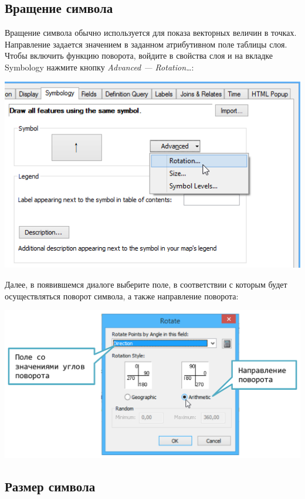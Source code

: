 \documentclass[]{book}
\theoremstyle{definition}
\theoremstyle{definition}
\theoremstyle{definition}
\theoremstyle{remark}
\begin{document}
\hypertarget{manual-vector-rotation}{%
\subsection{Вращение символа}\label{manual-vector-rotation}}

Вращение символа обычно используется для показа векторных величин в
точках. Направление задается значением в заданном атрибутивном поле
таблицы слоя. Чтобы включить функцию поворота, войдите в свойства слоя и
на вкладке Symbology нажмите кнопку \emph{Advanced ---
Rotation\ldots{}}:

\includegraphics{images/Appendix/image27.png}

Далее, в появившемся диалоге выберите поле, в соответствии с которым
будет осуществляться поворот символа, а также направление поворота:

\includegraphics{images/Appendix/image28.png}

\hypertarget{manual-vector-size}{%
\subsection{Размер символа}\label{manual-vector-size}}
\end{document}
